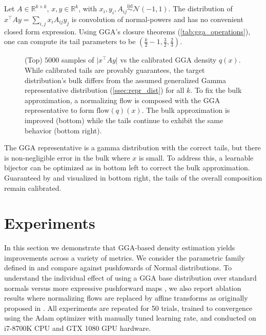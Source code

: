\documentclass[thesis.tex]{subfiles}
\begin{document}
\begin{example}
	Let $A \in \mathbb{R}^{k \times k}$, $x,y\in\mathbb{R}^k$, with $x_i,y_i,A_{ij} \overset{\text{iid}}{\sim} \mathcal{N}(-1,1)$.
	The distribution of $x^\top A y = \sum_{i,j} x_i A_{ij} y_j$ is convolution of normal-powers \citep{gupta2008analyzing} and has no convenient
	closed form expression.
	Using GGA's closure theorems (\cref{tab:gga_operations}), one can compute
	its tail parameters to be $(\frac{k}{2}-1,\frac{3}{2}, \frac{2}{3})$.

	\begin{figure}[h]
		\centering
		
		
		\caption{(Top) $5000$ samples of $\lvert x^\top A y \rvert$ vs the
		calibrated GGA density $q(x)$. While calibrated tails are provably guarantees,
		the target distribution's bulk differs from the assumed generalized Gamma representative distribution (\cref{ssec:repr_dist}) for all $k$.
		To fix the bulk approximation, a normalizing flow is composed with
		the GGA representative to form $\text{flow}(q)(x)$. The bulk approximation
		is improved (bottom) while the tails continue to exhibit the same
		behavior (bottom right).
		}
		\label{fig:power_normal}
	\end{figure}

	The GGA representative is a gamma distribution with the correct tails, but there is non-negligible error in the bulk where $x$ is small. To address this, a learnable bijector can be
	optimized as in  bottom left to correct the bulk approximation. Guaranteed by  and
	visualized in  bottom right, the tails of the overall composition remain calibrated.
\end{example}

\section{Experiments}\label{sec:experiments}

In this section we demonstrate that GGA-based density estimation yields improvements across a variety of metrics.
We consider the parametric family defined in  and compare against pushfowards of Normal distributions. To understand the individual
effect of using a GGA base distribution over standard normals versus more expressive pushforward maps \citep{durkan2019neural}, we also report ablation results where
normalizing flows are replaced by affine transforms as originally
proposed in \citep{kucukelbir2017automatic}. All experiments are repeated for 50 trials, trained to convergence using the Adam optimizer with manually tuned learning rate,
and conducted on i7-8700K CPU and GTX 1080 GPU hardware.
\end{document}
